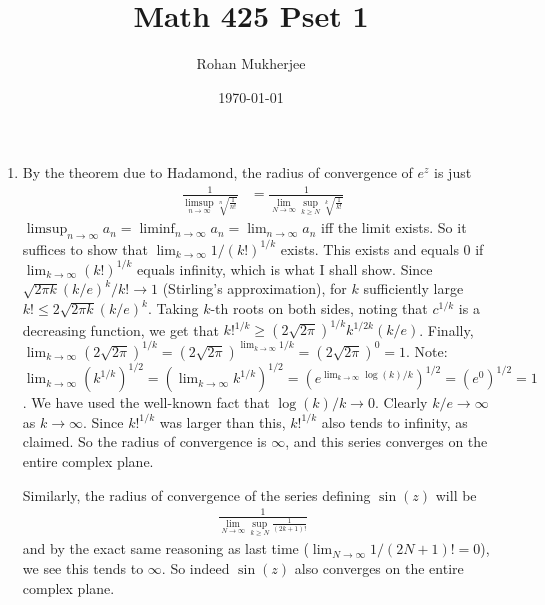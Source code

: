 \documentclass[12pt]{article}
\title{Math 425 Pset 1}
\date{\today}
\author{Rohan Mukherjee}
\theoremstyle{definition}
\theoremstyle{remark}
\begin{document}
	\maketitle
	\begin{enumerate}[leftmargin=\labelsep]
		\item By the theorem due to Hadamond, the radius of convergence of $e^z$ is just 
		\begin{align*}
			\frac1{\limsup_{n \to \infty} \sqrt[n]{\frac{1}{n!}}} &= \frac1{\lim_{N \to \infty} \sup_{k \geq N} \sqrt[k]{\frac{1}{k!}}}
		\end{align*}
		$\limsup_{n \to \infty} a_n = \liminf_{n\to \infty} a_n = \lim_{n \to \infty} a_n$ iff the limit exists. So it suffices to show that $\lim_{k \to \infty} 1/(k!)^{1/k}$ exists. This exists and equals 0 if $\lim_{k \to \infty} (k!)^{1/k}$ equals infinity, which is what I shall show. Since $\sqrt{2\pi k}(k/e)^k/k! \to 1$ (Stirling's approximation), for $k$ sufficiently large $k! \leq 2\sqrt{2\pi k}(k/e)^k$. Taking $k$-th roots on both sides, noting that $c^{1/k}$ is a decreasing function, we get that $k!^{1/k} \geq (2\sqrt{2\pi})^{1/k}k^{1/2k}(k/e)$. Finally, $\lim_{k \to \infty} (2\sqrt{2\pi})^{1/k} = (2\sqrt{2\pi})^{\lim_{k \to \infty} 1/k} = (2\sqrt{2\pi})^0 = 1$. Note: $\lim_{k \to \infty} (k^{1/k})^{1/2} = (\lim_{k \to \infty} k^{1/k})^{1/2} = (e^{\lim_{k \to \infty} \log(k)/k})^{1/2} = (e^0)^{1/2} = 1$. We have used the well-known fact that $\log(k)/k \to 0$. Clearly $k/e \to \infty$ as $k \to \infty$. Since $k!^{1/k}$ was larger than this, $k!^{1/k}$ also tends to infinity, as claimed. So the radius of convergence is $\infty$, and this series converges on the entire complex plane.
		
		Similarly, the radius of convergence of the series defining $\sin(z)$ will be
		\begin{align*}
			\frac1{\lim_{N\to \infty} \sup_{k \geq N} \frac{1}{(2k+1)!}}
		\end{align*}
		and by the exact same reasoning as last time ($\lim_{N \to \infty} 1/(2N+1)! = 0$), we see this tends to $\infty$. So indeed $\sin(z)$ also converges on the entire complex plane.
		

\end{enumerate}
\end{document}
